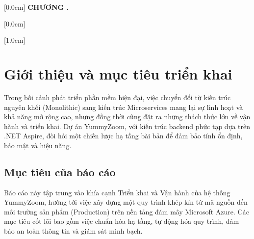 \documentclass[a4paper,12pt,twoside]{report}
\begin{document}


\renewcommand*\contentsname{MỤC LỤC}

    [0.0cm]
    {\bfseries\vspace{0.3cm}}
    {{\bfseries{\scshape} CHƯƠNG \thecontentslabel.\ }}
    {}
    {\contentspage}

    [0.0cm]
    {\vspace{0.3cm}}
    {\thecontentslabel \ }
    {}
    {\contentspage}

    [1.0cm]
    {\vspace{0.3cm}}
    {\thecontentslabel \ }
    {}
    {\contentspage}

\tableofcontents
\thispagestyle{empty}
\clearpage

\renewcommand{\listfigurename}{DANH MỤC HÌNH VẼ}
{\let\oldnumberline\numberline
\renewcommand{\numberline}{Hình~\oldnumberline}
\listoffigures}
\clearpage

\pagestyle{fancy}
\fancyhf{}
\fancyhead[RE, LO]{\leftmark}
\fancyfoot[RE, LO]{\thepage}


\chapter{Giới thiệu và mục tiêu triển khai}

Trong bối cảnh phát triển phần mềm hiện đại, việc chuyển đổi từ kiến trúc nguyên khối (Monolithic) sang kiến trúc Microservices mang lại sự linh hoạt và khả năng mở rộng cao, nhưng đồng thời cũng đặt ra những thách thức lớn về vận hành và triển khai. Dự án YummyZoom, với kiến trúc backend phức tạp dựa trên .NET Aspire, đòi hỏi một chiến lược hạ tầng bài bản để đảm bảo tính ổn định, bảo mật và hiệu năng.

\section{Mục tiêu của báo cáo}

Báo cáo này tập trung vào khía cạnh Triển khai và Vận hành của hệ thống YummyZoom, hướng tới việc xây dựng một quy trình khép kín từ mã nguồn đến môi trường sản phẩm (Production) trên nền tảng đám mây Microsoft Azure. Các mục tiêu cốt lõi bao gồm việc chuẩn hóa hạ tầng, tự động hóa quy trình, đảm bảo an toàn thông tin và giám sát minh bạch.
\end{document}
